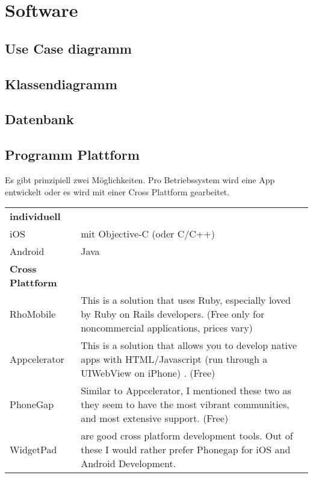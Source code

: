 \chapter{Software}

\section{Use Case diagramm}
\section{Klassendiagramm}

\section{Datenbank}


\section{Programm Plattform}

Es gibt prinzipiell zwei Möglichkeiten. Pro Betriebssystem wird eine App entwickelt oder es wird mit einer Cross Plattform gearbeitet\cite{appEinf}.


\begin{tabularx}{\textwidth}{lX}
\textbf{individuell}\cite{appEinf}&\\
iOS & mit  Objective-C (oder C/C++)\\
Android & Java \\
\textbf{Cross Plattform}\cite{crossPlat}&\\
    RhoMobile & This is a solution that uses Ruby, especially loved by Ruby on Rails developers. (Free only for noncommercial applications, prices vary)\\
    Appcelerator & This is a solution that allows you to develop native apps with HTML/Javascript (run through a UIWebView on iPhone) . (Free)\\
    PhoneGap & Similar to Appcelerator, I mentioned these two as they seem to have the most vibrant communities, and most extensive support. (Free)\\
    WidgetPad & are good cross platform development tools. Out of these I would rather prefer Phonegap for iOS and Android Development.\\
\end{tabularx}
\centering{{$\vdots$}}

